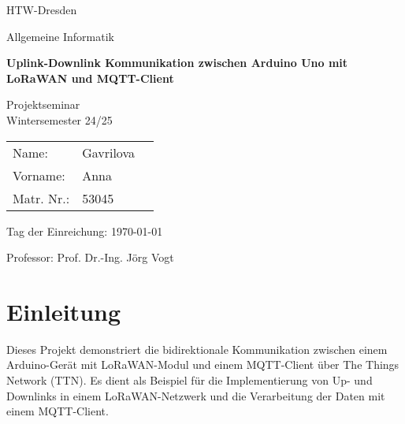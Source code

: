 \documentclass[12pt,a4paper]{article}
\begin{document}
  \begin{titlepage}

    \begin{center}
      \Huge
  
      HTW-Dresden
  
      Allgemeine Informatik
  
      \bigskip
  
      \LARGE
  
      \vfill
  
      \huge
  
      \textbf{Uplink-Downlink Kommunikation zwischen Arduino Uno mit LoRaWAN und MQTT-Client}
  
      \LARGE
  
      \vfill
  
      Projektseminar\\
      Wintersemester 24/25
  
      \bigskip
  
    \end{center}
  
    \vfill
  
    \Large

  
    \vspace*{2\bigskipamount}
  
    \centering

    \begingroup
      \setlength{\tabcolsep}{12pt}
      \begin{tabular}{lll}
        Name:     & Gavrilova  \\[2.0ex]
        Vorname:  & Anna   \\[2.0ex]
        Matr. Nr.: & 53045  
      \end{tabular}
    \endgroup
  
    \vspace*{4\bigskipamount}
  

    Tag der Einreichung: \today
  
    \vspace*{2\bigskipamount}
  
    Professor: Prof. Dr.-Ing. Jörg Vogt 
  
  \end{titlepage}

  \noindent

  \tableofcontents
  \newpage

\section{Einleitung}
Dieses Projekt demonstriert die bidirektionale Kommunikation zwischen einem Arduino-Gerät mit LoRaWAN-Modul und einem MQTT-Client über The Things Network (TTN). Es dient als Beispiel für die Implementierung von Up- und Downlinks in einem LoRaWAN-Netzwerk und die Verarbeitung der Daten mit einem MQTT-Client.
\end{document}
